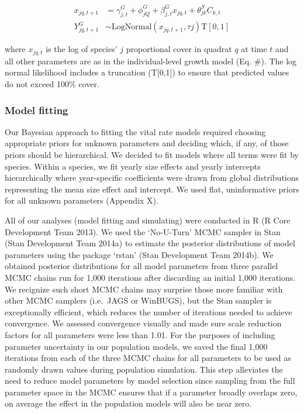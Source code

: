 \documentclass[12pt,]{article}
\begin{document}
\begin{align}
x_{jq,t+1} &= \gamma^{G}_{j,t} + \phi^{G}_{jQ} + \beta^{G}_{j,t}x_{jq,t} + \theta^{S}_{jk}C_{k,t} \\
Y^{G}_{jq,t+1} &\sim \text{LogNormal}(x_{jq,t+1}, \tau{j}) \text{T}[0,1]
\end{align}

where $x_{jq,t}$ is the log of species' $j$ proportional cover in
quadrat $q$ at time $t$ and all other parameters are as in the
individual-level growth model (Eq. \#). The log normal likelihood
includes a truncation (T{[}0,1{]}) to ensure that predicted values do
not exceed 100\% cover.

\subsubsection{Model fitting}\label{model-fitting}

Our Bayesian approach to fitting the vital rate models required choosing
appropriate priors for unknown parameters and deciding which, if any, of
those priors should be hierarchical. We decided to fit models where all
terms were fit by species. Within a species, we fit yearly size effects
and yearly intercepts hierarchically where year-specific coefficients
were drawn from global distributions representing the mean size effect
and intercept. We used flat, uninformative priors for all unknown
parameters (Appendix X).

All of our analyses (model fitting and simulating) were conducted in R
(R Core Development Team 2013). We used the `No-U-Turn' MCMC sampler in
Stan (Stan Development Team 2014a) to estimate the posterior
distributions of model parameters using the package `rstan' (Stan
Development Team 2014b). We obtained posterior distributions for all
model parameters from three parallel MCMC chains run for 1,000
iterations after discarding an initial 1,000 iterations. We recignize
such short MCMC chains may surprise those more familiar with other MCMC
samplers (i.e.~JAGS or WinBUGS), but the Stan sampler is exceptionally
efficient, which reduces the number of iterations needed to achieve
convergence. We assessed convergence visually and made sure scale
reduction factors for all parameters were less than 1.01. For the
purposes of including parameter uncertainty in our population models, we
saved the final 1,000 iterations from each of the three MCMC chains for
all parameters to be used as randomly drawn values during population
simulation. This step alleviates the need to reduce model parameters by
model selection since sampling from the full parameter space in the MCMC
ensures that if a parameter broadly overlaps zero, on average the effect
in the population models will also be near zero.
\end{document}

